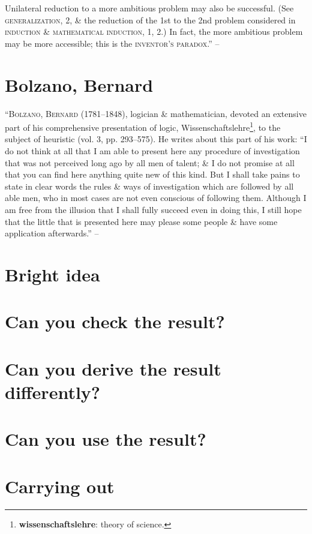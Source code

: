 \documentclass[oneside]{book}
\numberwithin{equation}{section}
\begin{document}
Unilateral reduction to a more ambitious problem may also be successful. (See \textsc{generalization}, 2, \& the reduction of the 1st to the 2nd problem considered in \textsc{induction \& mathematical induction}, 1, 2.) In fact, the more ambitious problem may be more accessible; this is the \textsc{inventor's paradox}.'' -- \cite[pp. 50--57]{Polya2014}

\section{Bolzano, Bernard}
``\textsc{Bolzano, Bernard} (1781--1848), logician \& mathematician, devoted an extensive part of his comprehensive presentation of logic, Wissenschaftslehre\footnote{\textbf{wissenschaftslehre}: theory of science.}, to the subject of heuristic (vol. 3, pp. 293--575). He writes about this part of his work: ``I do not think at all that I am able to present here any procedure of investigation that was not perceived long ago by all men of talent; \& I do not promise at all that you can find here anything quite new of this kind. But I shall take pains to state in clear words the rules \& ways of investigation which are followed by all able men, who in most cases are not even conscious of following them. Although I am free from the illusion that I shall fully succeed even in doing this, I still hope that the little that is presented here may please some people \& have some application afterwards.'' -- \cite[pp. 57--58]{Polya2014}

\section{Bright idea}

\section{Can you check the result?}

\section{Can you derive the result differently?}

\section{Can you use the result?}

\section{Carrying out}
\end{document}
